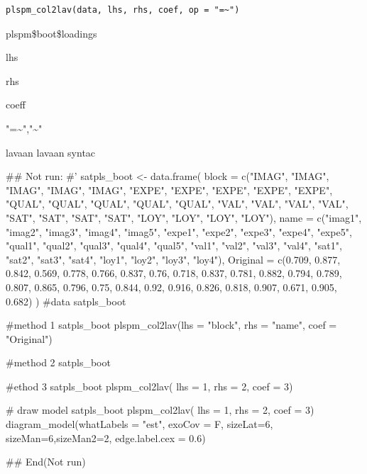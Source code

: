 \documentclass[a4paper]{book}
\begin{document}
%
\begin{Usage}
\begin{verbatim}
plspm_col2lav(data, lhs, rhs, coef, op = "=~")
\end{verbatim}
\end{Usage}
%
\begin{Arguments}
\begin{ldescription}
\item[\code{data}] plspm\$boot\$loadings

\item[\code{lhs}] lhs

\item[\code{rhs}] rhs

\item[\code{coef}] coeff

\item[\code{op}] "=\textasciitilde{}","\textasciitilde{}"
\end{ldescription}
\end{Arguments}
%
\begin{Value}
lavaan lavaan syntac
\end{Value}
%
\begin{Examples}
\begin{ExampleCode}

## Not run: 
#'
satpls_boot <- data.frame(
  block = c("IMAG", "IMAG", "IMAG",
  "IMAG", "IMAG", "EXPE", "EXPE",
  "EXPE", "EXPE", "EXPE", "QUAL",
  "QUAL", "QUAL", "QUAL", "QUAL",
  "VAL", "VAL", "VAL", "VAL", "SAT",
  "SAT", "SAT", "SAT", "LOY", "LOY",
  "LOY", "LOY"),
  name = c("imag1", "imag2", "imag3",
   "imag4", "imag5", "expe1", "expe2",
    "expe3", "expe4", "expe5", "qual1",
     "qual2", "qual3", "qual4", "qual5",
     "val1", "val2", "val3", "val4",
     "sat1", "sat2", "sat3", "sat4",
     "loy1", "loy2", "loy3", "loy4"),
  Original = c(0.709, 0.877, 0.842,
   0.569, 0.778, 0.766, 0.837, 0.76,
   0.718, 0.837, 0.781, 0.882, 0.794,
    0.789, 0.807, 0.865, 0.796, 0.75,
    0.844, 0.92, 0.916, 0.826, 0.818,
     0.907, 0.671, 0.905, 0.682)
)
#data
satpls_boot

#method 1
satpls_boot %
plspm_col2lav(lhs = "block", rhs = "name", coef = "Original")

#method 2
satpls_boot %

#ethod 3
satpls_boot %
plspm_col2lav( lhs = 1, rhs = 2, coef = 3)

# draw model
satpls_boot %
plspm_col2lav( lhs = 1, rhs = 2, coef = 3)%
  diagram_model(whatLabels = "est", exoCov = F,
  sizeLat=6, sizeMan=6,sizeMan2=2,
                edge.label.cex = 0.6)



## End(Not run)

\end{ExampleCode}
\end{Examples}
\end{document}
